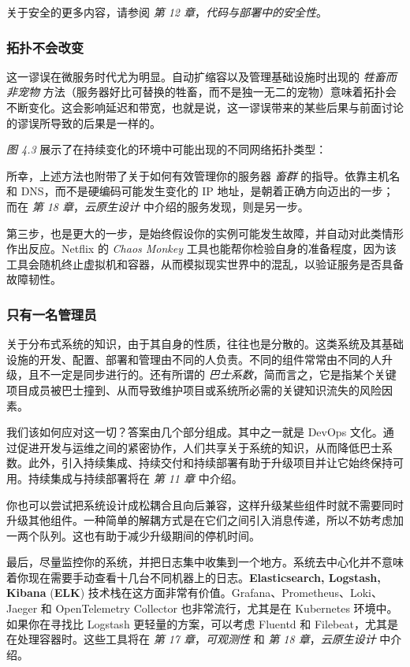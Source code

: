 关于安全的更多内容，请参阅 \emph{第 12 章}，\emph{代码与部署中的安全性}。

\subsubsection{拓扑不会改变}

这一谬误在微服务时代尤为明显。自动扩缩容以及管理基础设施时出现的 \emph{牲畜而非宠物} 方法（服务器好比可替换的牲畜，而不是独一无二的宠物）意味着拓扑会不断变化。这会影响延迟和带宽，也就是说，这一谬误带来的某些后果与前面讨论的谬误所导致的后果是一样的。

\emph{图 4.3} 展示了在持续变化的环境中可能出现的不同网络拓扑类型：


\label{idx:290}
所幸，上述方法也附带了关于如何有效管理你的服务器 \emph{畜群} 的指导。依靠主机名和 DNS，而不是硬编码可能发生变化的 IP 地址，是朝着正确方向迈出的一步；而在 \emph{第 18 章}，\emph{云原生设计} 中介绍的服务发现，则是另一步。

第三步，也是更大的一步，是始终假设你的实例可能发生故障，并自动对此类情形作出反应。Netflix 的 \emph{Chaos Monkey} 工具也能帮你检验自身的准备程度，因为该工具会随机终止虚拟机和容器，从而模拟现实世界中的混乱，以验证服务是否具备故障韧性。

\subsubsection{只有一名管理员}

\label{idx:291}
关于分布式系统的知识，由于其自身的性质，往往也是分散的。这类系统及其基础设施的开发、配置、部署和管理由不同的人负责。不同的组件常常由不同的人升级，且不一定是同步进行的。还有所谓的 \emph{巴士系数}，简而言之，它是指某个关键项目成员被巴士撞到、从而导致维护项目或系统所必需的关键知识流失的风险因素。

我们该如何应对这一切？答案由几个部分组成。其中之一就是 DevOps 文化。通过促进开发与运维之间的紧密协作，人们共享关于系统的知识，从而降低巴士系数。此外，引入持续集成、持续交付和持续部署有助于升级项目并让它始终保持可用。持续集成与持续部署将在 \emph{第 11 章} 中介绍。

\label{idx:292}
你也可以尝试把系统设计成松耦合且向后兼容，这样升级某些组件时就不需要同时升级其他组件。一种简单的解耦方式是在它们之间引入消息传递，所以不妨考虑加一两个队列。这也有助于减少升级期间的停机时间。

\label{idx:293}
最后，尽量监控你的系统，并把日志集中收集到一个地方。系统去中心化并不意味着你现在需要手动查看十几台不同机器上的日志。\textbf{Elasticsearch, Logstash, Kibana }(\textbf{ELK}) 技术栈在这方面非常有价值。Grafana、Prometheus、Loki、Jaeger 和 OpenTelemetry Collector 也非常流行，尤其是在 Kubernetes 环境中。如果你在寻找比 Logstash 更轻量的方案，可以考虑 Fluentd 和 Filebeat，尤其是在处理容器时。这些工具将在 \emph{第 17 章}，\emph{可观测性} 和 \emph{第 18 章}，\emph{云原生设计} 中介绍。

